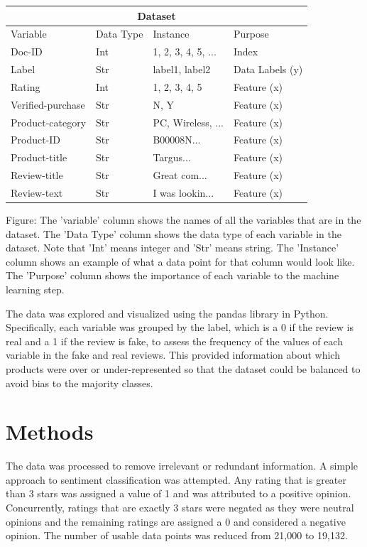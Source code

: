\documentclass[12pt]{article}
\begin{document}
\begin{tabular}{ |p{3cm}||p{3cm}|p{3cm}|p{3cm}|  }
 \hline
 \multicolumn{4}{|c|}{Dataset} \\
 \hline
 Variable& Data Type &Instance &Purpose\\
 \hline
 Doc-ID&Int&1, 2, 3, 4, 5, ...&Index\\
 Label&Str&label1, label2&Data Labels (y)\\
 Rating&Int&1, 2, 3, 4, 5&Feature (x)\\
 Verified-purchase&Str&N, Y&Feature (x)\\
 Product-category&Str&PC, Wireless, ...&Feature (x)\\
 Product-ID&Str&B00008N...&Feature (x)\\
 Product-title&Str&Targus...&Feature (x)\\
 Review-title&Str&Great com...&Feature (x)\\
 Review-text&Str&I was lookin...&Feature (x)\\
 \hline
\end{tabular}

\bigskip
\bigskip

\caption{Figure: The 'variable' column shows the names of all the variables that are in the dataset. The 'Data Type' column shows the data type of each variable in the dataset. Note that 'Int' means integer and 'Str' means string. The 'Instance' column shows an example of what a data point for that column would look like. The 'Purpose' column shows the importance of each variable to the machine learning step.}

The data was explored and visualized using the pandas library in Python. Specifically, each variable was grouped by the label, which is a 0 if the review is real and a 1 if the review is fake, to assess the frequency of the values of each variable in the fake and real reviews. This provided information about which products were over or under-represented so that the dataset could be balanced to avoid bias to the majority classes.

\section{Methods}
\label{sec:methods}
The data was processed to remove irrelevant or redundant information. A simple approach to sentiment classification was attempted. Any rating that is greater than 3 stars was assigned a value of 1 and was attributed to a positive opinion. Concurrently, ratings that are exactly 3 stars were negated as they were neutral opinions and the remaining ratings are assigned a 0 and considered a negative opinion. The number of usable data points was reduced from 21,000 to 19,132.
\end{document}
